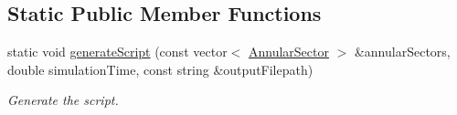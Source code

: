 \subsection*{\-Static \-Public \-Member \-Functions}
\begin{DoxyCompactItemize}
\item 
static void \hyperlink{classmultiscale_1_1video_1_1PolarGnuplotScriptGenerator_a9e60fa7dd9c47dc89cdce30a39175a6e}{generate\-Script} (const vector$<$ \hyperlink{classmultiscale_1_1video_1_1AnnularSector}{\-Annular\-Sector} $>$ \&annular\-Sectors, double simulation\-Time, const string \&output\-Filepath)
\begin{DoxyCompactList}\small\item\em \-Generate the script. \end{DoxyCompactList}\end{DoxyCompactItemize}
